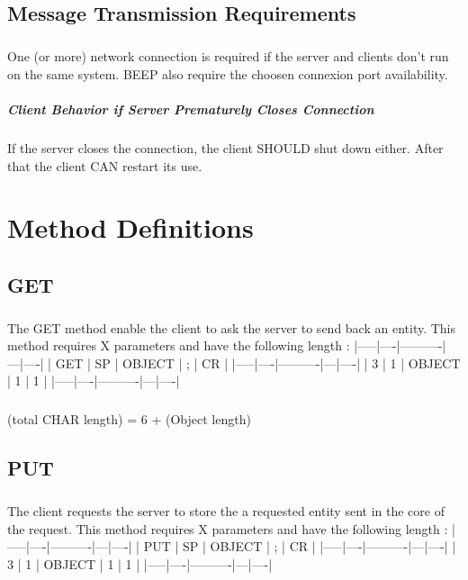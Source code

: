     \section{Message Transmission Requirements}
        \paragraph{}
One (or more) network connection is required if the server and clients
don't run on the same system.
BEEP also require the choosen connexion port availability.
        \paragraph{Client Behavior if Server Prematurely Closes Connection}
If the server closes the connection, the client SHOULD shut down either.
After that the client CAN restart its use.


    \clearpage
\chapter{Method Definitions}
    \section{GET}
        \paragraph{}
The GET method enable the client to ask the server to send back an entity.
This method requires X parameters and have the following length :
|-----|----|----------|---|----|
| GET | SP | {OBJECT} | ; | CR |
|-----|----|----------|---|----|
|  3  |  1 | {OBJECT} | 1 |  1 |
|-----|----|----------|---|----|
        \paragraph{}
(total CHAR length) = 6
+ ({Object} length)
    \section{PUT}
        \paragraph{}
The client requests the server to store the a requested entity sent
in the core of the request.
This method requires X parameters and have the following length :
|-----|----|----------|---|----|
| PUT | SP | {OBJECT} | ; | CR |
|-----|----|----------|---|----|
|  3  |  1 | {OBJECT} | 1 |  1 |
|-----|----|----------|---|----|
